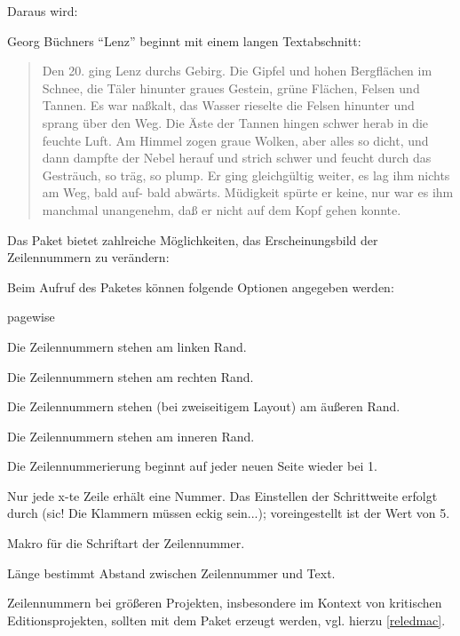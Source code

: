 Daraus wird:
\bigskip

 Georg Büchners \enquote{Lenz} beginnt mit einem langen Textabschnitt:

 \begin{quotation}
 \modulolinenumbers[5]
 \linenumbers
 Den 20. ging Lenz durchs Gebirg. Die Gipfel und hohen Bergflächen im Schnee, die Täler
 hinunter graues Gestein, grüne Flächen, Felsen und Tannen. Es war naßkalt, das Wasser
 rieselte die Felsen hinunter und sprang über den Weg. Die Äste der Tannen hingen schwer
 herab in die feuchte Luft. Am Himmel zogen graue Wolken, aber alles so dicht, und dann 
 dampfte der Nebel herauf und strich schwer und feucht durch das Gesträuch, so träg,
 so plump. Er ging gleichgültig weiter, es lag ihm nichts am Weg, bald auf- bald
 abwärts. Müdigkeit spürte er keine, nur war es ihm manchmal unangenehm, daß er nicht
 auf dem Kopf gehen konnte.
 \end{quotation}


Das Paket bietet zahlreiche Möglichkeiten, das Erscheinungsbild der Zeilennummern zu 
verändern:

Beim Aufruf des Paketes können folgende Optionen angegeben werden:

\begin{labeling}{pagewise}
 \item[left] Die Zeilennummern stehen am linken Rand.
 \item[right] Die Zeilennummern stehen am rechten Rand.
 \item[switch] Die Zeilennummern stehen (bei zweiseitigem Layout) am äußeren Rand.
 \item[switch*] Die Zeilennummern stehen am inneren Rand.
 \item[pagewise] Die Zeilennummerierung beginnt auf jeder neuen Seite wieder bei 1.
 \item[modulo] Nur jede x-te Zeile erhält eine Nummer. 
  Das Einstellen der Schrittweite erfolgt durch  
  (sic! Die Klammern müssen eckig sein...);
  voreingestellt ist der Wert von 5.
\end{labeling}

Makro  für die Schriftart der Zeilennummer.

Länge  bestimmt Abstand zwischen Zeilennummer und Text.

Zeilennummern bei größeren Projekten, insbesondere im Kontext von kritischen Editionsprojekten,
sollten mit dem Paket  erzeugt werden, vgl. hierzu \ref{reledmac}.

